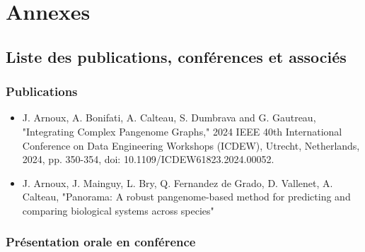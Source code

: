 \part*{Annexes}
\appendix
\let\oldaddtocontents\addtocontents
\def\addtocontents#1{%
   \def\tmpa{#1}%
   \def\tmpb{toc}%
   \ifx\tmpa\tmpb
      \def\tmpa{toca}%
   \fi
   \expandafter\oldaddtocontents\expandafter{\tmpa}}
\tableofcontentsA

\chapter{Liste des publications, conférences et associés}
\label{Ann:Communication}
\section{Publications}

\begin{itemize}
    \item J. Arnoux, A. Bonifati, A. Calteau, S. Dumbrava and G. Gautreau, "Integrating Complex Pangenome Graphs," 2024 IEEE 40th International Conference on Data Engineering Workshops (ICDEW), Utrecht, Netherlands, 2024, pp. 350-354, doi: 10.1109/ICDEW61823.2024.00052.
    \item J. Arnoux, J. Mainguy, L. Bry, Q. Fernandez de Grado, D. Vallenet, A. Calteau, "Panorama: A robust pangenome-based method for predicting and comparing biological systems across species"
\end{itemize}

\section{Présentation orale en conférence}

